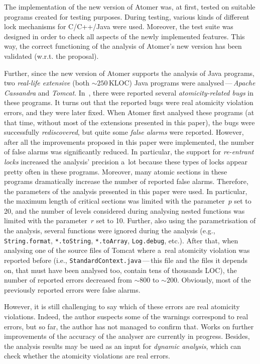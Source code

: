\documentclass{ExcelAtFIT}
\theoremstyle{example}
\def\uv#1{\iflanguage{british}{``#1''}{\quotedblbase #1\textquotedblleft}}
\begin{document}
The implementation of the new version of Atomer was, at first, tested on suitable programs created for testing purposes. During testing, various kinds of different lock mechanisms for C/C++/Java were used. Moreover, the test suite was designed in order to check all aspects of the newly implemented features. This way, the correct functioning of the analysis of Atomer's new version has been validated (w.r.t. the proposal).

Further, since the new version of Atomer supports the analysis of Java programs, two \emph{real-life extensive} (both $ \sim\!250 $\,KLOC) Java programs were analysed\,---\,\emph{Apache Cassandra} and \emph{Tomcat}. In~\cite{contracts2017}, there were reported several \emph{atomicity-related bugs} in these programs. It turns out that the reported bugs were real atomicity violation errors, and they were later fixed. When Atomer first analysed these programs (at that time, without most of the extensions presented in this paper), the bugs were successfully \emph{rediscovered}, but quite some \emph{false alarms} were reported. However, after all the improvements proposed in this paper were implemented, the number of false alarms was significantly reduced. In particular, the support for \emph{re-entrant locks} increased the analysis' precision a~lot because these types of locks appear pretty often in these programs. Moreover, many \uv{large} atomic sections in these programs dramatically increase the number of reported false alarms. Therefore, the parameters of the analysis presented in this paper were used. In particular, the maximum length of critical sections was limited with the parameter~$ p $ set to 20, and the number of levels considered during analysing nested functions was limited with the parameter~$ r $ set to 10. Further, also using the parametrisation of the analysis, several \uv{non-critical} functions were ignored during the analysis (e.g., \texttt{String.format}, \texttt{*.toString}, \texttt{*.toArray}, \texttt{Log.debug}, etc.). After that, when analysing one of the source files of Tomcat where a~real atomicity violation was reported before (i.e., \texttt{StandardContext.java}\,---\,this file and the files it depends on, that must have been analysed too, contain tens of thousands LOC), the number of reported errors decreased from $ \sim\!800 $ to $ \sim\!200 $. Obviously, most of the previously reported errors were false alarms.

However, it is still challenging to say which of these errors are real atomicity violations. Indeed, the author suspects some of the warnings correspond to real errors, but so far, the author has not managed to confirm that. Works on further improvements of the accuracy of the analyser are currently in progress. Besides, the analysis results may be used as an input for \emph{dynamic analysis}, which can check whether the atomicity violations are real errors.
\end{document}

